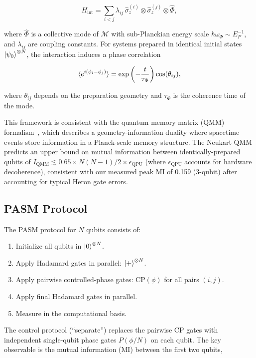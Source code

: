 ﻿\documentclass[12pt,a4paper]{article}
\begin{document}
\begin{equation}
H_{\text{int}} = \sum_{i<j} \lambda_{ij} \, \hat{\sigma}^{(i)}_z \otimes \hat{\sigma}^{(j)}_z \otimes \hat{\Phi},
\end{equation}

where $\hat{\Phi}$ is a collective mode of $\mathcal{M}$ with sub-Planckian energy scale $\hbar\omega_\Phi \sim E_P^{-1}$, and $\lambda_{ij}$ are coupling constants. For systems prepared in identical initial states $\ket{\psi_0}^{\otimes N}$, the interaction induces a phase correlation

\begin{equation}
\braket{e^{i(\phi_i - \phi_j)}} = \exp\left(-\frac{t}{\tau_\Phi}\right) \cos(\theta_{ij}),
\end{equation}

where $\theta_{ij}$ depends on the preparation geometry and $\tau_\Phi$ is the coherence time of the mode.

This framework is consistent with the quantum memory matrix (QMM) formalism~\cite{neukart2025}, which describes a geometry-information duality where spacetime events store information in a Planck-scale memory structure. The Neukart QMM predicts an upper bound on mutual information between identically-prepared qubits of $I_{\text{QMM}} \lesssim 0.65 \times N(N-1)/2 \times \epsilon_{\text{QPU}}$ (where $\epsilon_{\text{QPU}}$ accounts for hardware decoherence), consistent with our measured peak MI of 0.159 (3-qubit) after accounting for typical Heron gate errors.

\subsection{PASM Protocol}

The PASM protocol for $N$ qubits consists of:

\begin{enumerate}
    \item Initialize all qubits in $\ket{0}^{\otimes N}$.
    \item Apply Hadamard gates in parallel: $\ket{+}^{\otimes N}$.
    \item Apply pairwise controlled-phase gates: $\text{CP}(\phi)$ for all pairs $(i,j)$.
    \item Apply final Hadamard gates in parallel.
    \item Measure in the computational basis.
\end{enumerate}

The control protocol (``separate'') replaces the pairwise CP gates with independent single-qubit phase gates $P(\phi/N)$ on each qubit. The key observable is the mutual information (MI) between the first two qubits,
\end{document}
